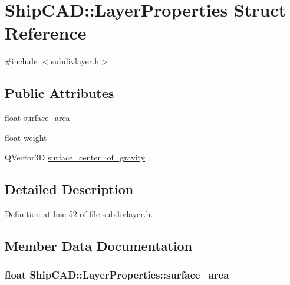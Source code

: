 \hypertarget{structShipCAD_1_1LayerProperties}{\section{Ship\-C\-A\-D\-:\-:Layer\-Properties Struct Reference}
\label{structShipCAD_1_1LayerProperties}
}


{\ttfamily \#include $<$subdivlayer.\-h$>$}

\subsection*{Public Attributes}
\begin{DoxyCompactItemize}
\item 
float \hyperlink{structShipCAD_1_1LayerProperties_aff6dab68937efc1abd7bb5066373f514}{surface\-\_\-area}
\item 
float \hyperlink{structShipCAD_1_1LayerProperties_a4e9844dd95994725401ad93c5c3a00e9}{weight}
\item 
Q\-Vector3\-D \hyperlink{structShipCAD_1_1LayerProperties_a1b4bc8254c8cb90df594bc7905ce3e22}{surface\-\_\-center\-\_\-of\-\_\-gravity}
\end{DoxyCompactItemize}


\subsection{Detailed Description}


Definition at line 52 of file subdivlayer.\-h.



\subsection{Member Data Documentation}
\hypertarget{structShipCAD_1_1LayerProperties_aff6dab68937efc1abd7bb5066373f514}{
\subsubsection[{surface\-\_\-area}]{\setlength{\rightskip}{0pt plus 5cm}float Ship\-C\-A\-D\-::\-Layer\-Properties\-::surface\-\_\-area}}\label{structShipCAD_1_1LayerProperties_aff6dab68937efc1abd7bb5066373f514}


